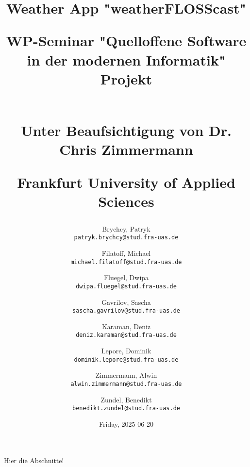 \documentclass{article}
\title{Weather App "weatherFLOSScast"\\
  {%
    \onehalfspacing
    \begin{large}
    WP-Seminar "Quelloffene Software in der modernen Informatik" Projekt
    \end{large}\\
    \small Unter Beaufsichtigung von Dr. Chris Zimmermann\\
  }
  \begin{normalsize}
    Frankfurt University of Applied Sciences
  \end{normalsize}
}
\author{
  Brychcy, Patryk \\
  \texttt{patryk.brychcy@stud.fra-uas.de}
  \and
  Filatoff, Michael \\
  \texttt{michael.filatoff@stud.fra-uas.de}
  \and
  Fluegel, Dwipa \\
  \texttt{dwipa.fluegel@stud.fra-uas.de}
  \and
  Gavrilov, Sascha \\
  \texttt{sascha.gavrilov@stud.fra-uas.de}
  \and
  Karaman, Deniz \\
  \texttt{deniz.karaman@stud.fra-uas.de}
  \and
  Lepore, Dominik \\
  \texttt{dominik.lepore@stud.fra-uas.de}
  \and
  Zimmermann, Alwin \\
  \texttt{alwin.zimmermann@stud.fra-uas.de}
  \and
  Zundel, Benedikt \\
  \texttt{benedikt.zundel@stud.fra-uas.de}
}
\date{Friday, 2025-06-20}
\begin{document}
\maketitle

\newpage

\tableofcontents

\newpage

\listoffigures
\lstlistoflistings

\newpage

Hier die Abschnitte!

\newpage



\end{document}
